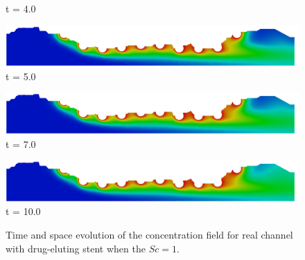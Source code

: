 \begin{figure}[H]
\begin{minipage}{.50\linewidth}
      t = 4.0
     \end{minipage}%
     \begin{minipage}{.50\linewidth}
      \centering
      \includegraphics[scale=0.12]{./02_chaps/cap_solution/figure/conc1_RealStrut10000.png}\\
      t = 5.0
     \end{minipage}
     \begin{minipage}{.50\linewidth}
     \medskip
      \centering
      \includegraphics[scale=0.12]{./02_chaps/cap_solution/figure/conc1_RealStrut14000.png}\\
      t = 7.0
     \end{minipage}%
     \begin{minipage}{.50\linewidth}
     \medskip
      \centering
      \includegraphics[scale=0.12]{./02_chaps/cap_solution/figure/conc1_RealStrut20000.png}\\
      t = 10.0
     \end{minipage}
     \medskip
     \caption{
Time and space evolution of the concentration field for real channel 
with drug-eluting stent when the $Sc=1$.}
     \label{conc field real stent sc 1}
\end{figure}

